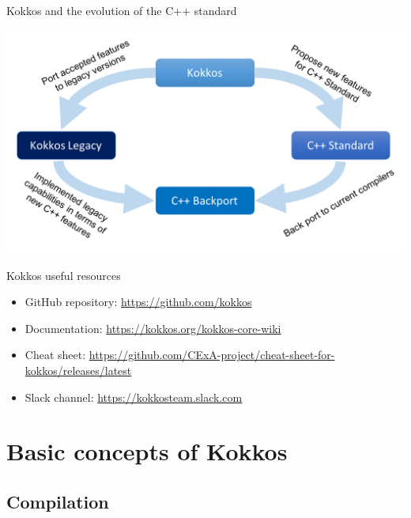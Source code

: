 \documentclass[aspectratio=169]{beamer}
\begin{document}

\begin{frame}{Kokkos and the evolution of the C++ standard}
    \begin{center}
        \includegraphics[width=\textwidth]{kokkos-cpp-standard.png}
    \end{center}
\end{frame}


\begin{frame}{Kokkos useful resources}
    \begin{itemize}
        \item GitHub repository: \url{https://github.com/kokkos}
        \item Documentation: \url{https://kokkos.org/kokkos-core-wiki}
        \item Cheat sheet: \url{https://github.com/CExA-project/cheat-sheet-for-kokkos/releases/latest}
        \item Slack channel: \url{https://kokkosteam.slack.com}
    \end{itemize}
\end{frame}


\section{Basic concepts of Kokkos}


\subsection{Compilation}
\end{document}
